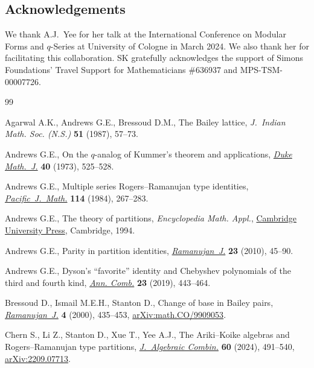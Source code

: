 \documentclass[pdftex]{sigma}
\numberwithin{equation}{section}
\begin{document}
\subsection*{Acknowledgements}

We thank A.J.\ Yee for her talk at the International Conference on Modular Forms and $q$-Series at University of Cologne in March 2024. We also thank her for facilitating this collaboration. SK gratefully acknowledges the support of Simons Foundations' Travel Support for Mathematicians \#636937 and MPS-TSM-00007726.

%
%

\begin{thebibliography}{99}
\footnotesize\itemsep=0pt

Agarwal A.K., Andrews G.E., Bressoud D.M., The {B}ailey lattice,
 \textit{J.~Indian Math. Soc. (N.S.)} \textbf{51} (1987), 57--73.

Andrews G.E., On the {$q$}-analog of {K}ummer's theorem and applications,
 \href{https://doi.org/10.1215/S0012-7094-73-04045-3}{\textit{Duke Math.~J.}} \textbf{40} (1973), 525--528.

Andrews G.E., Multiple series {R}ogers--{R}amanujan type identities,
 \href{https://doi.org/10.2140/pjm.1984.114.267}{\textit{Pacific~J.~Math.}} \textbf{114} (1984), 267--283.

Andrews G.E., The theory of partitions, \textit{Encyclopedia Math. Appl.}, \href{https://doi.org/10.1017/CBO9780511608650}{Cambridge
 University Press}, Cambridge, 1994.

Andrews G.E., Parity in partition identities, \href{https://doi.org/10.1007/s11139-008-9150-0}{\textit{Ramanujan~J.}} \textbf{23}
 (2010), 45--90.

Andrews G.E., Dyson's ``favorite'' identity and {C}hebyshev polynomials of the
 third and fourth kind, \href{https://doi.org/10.1007/s00026-019-00443-w}{\textit{Ann. Comb.}} \textbf{23} (2019), 443--464.

Bressoud D., Ismail M.E.H., Stanton D., Change of base in {B}ailey pairs,
 \href{https://doi.org/10.1023/A:1009824218230}{\textit{Ramanujan~J.}} \textbf{4} (2000), 435--453, \href{https://arxiv.org/abs/math.CO/9909053}{arXiv:math.CO/9909053}.

Chern S., Li Z., Stanton D., Xue T., Yee A.J., The {A}riki--{K}oike algebras
 and {R}ogers--{R}amanujan type partitions, \href{https://doi.org/10.1007/s10801-024-01340-z}{\textit{J.~Algebraic Combin.}}
 \textbf{60} (2024), 491--540, \href{https://arxiv.org/abs/2209.07713}{arXiv:2209.07713}.


\end{thebibliography}
\end{document}
